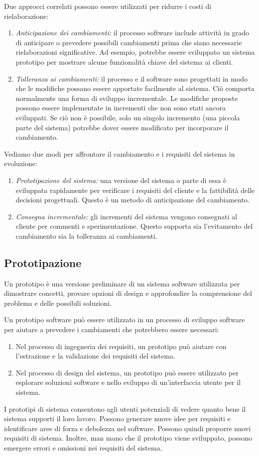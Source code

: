 Due approcci correlati possono essere utilizzati per ridurre i costi di rielaborazione:
\begin{enumerate}
    \item \textit{Anticipazione dei cambiamenti:} il processo software include attività in grado di anticipare o prevedere possibili cambiamenti prima che siano necessarie rielaborazioni significative. Ad esempio, potrebbe essere sviluppato un sistema prototipo per mostrare alcune funzionalità chiave del sistema ai clienti.
    \item \textit{Tolleranza ai cambiamenti:} il processo e il software sono progettati in modo che le modifiche possano essere apportate facilmente al sistema. Ciò comporta normalmente una forma di sviluppo incrementale. Le modifiche proposte possono essere implementate in incrementi che non sono stati ancora sviluppati. Se ciò non è possibile, solo un singolo incremento (una piccola parte del sistema) potrebbe dover essere modificato per incorporare il cambiamento.
\end{enumerate}
Vediamo due modi per affrontare il cambiamento e i requisiti del sistema in evoluzione:
\begin{enumerate}
    \item \textit{Prototipazione del sistema:} una versione del sistema o parte di essa è sviluppata rapidamente per verificare i requisiti del cliente e la fattibilità delle decisioni progettuali. Questo è un metodo di anticipazione del cambiamento.
    \item \textit{Consegna incrementale:} gli incrementi del sistema vengono consegnati al cliente per commenti e sperimentazione. Questo supporta sia l'evitamento del cambiamento sia la tolleranza ai cambiamenti.
\end{enumerate}

\subsection{Prototipazione}
Un prototipo è una versione preliminare di un sistema software utilizzata per dimostrare concetti, provare opzioni di design e approfondire la comprensione del problema e delle possibili soluzioni.

Un prototipo software può essere utilizzato in un processo di sviluppo software per aiutare a prevedere i cambiamenti che potrebbero essere necessari:
\begin{enumerate}
    \item Nel processo di ingegneria dei requisiti, un prototipo può aiutare con l'estrazione e la validazione dei requisiti del sistema.
    \item Nel processo di design del sistema, un prototipo può essere utilizzato per esplorare soluzioni software e nello sviluppo di un'interfaccia utente per il sistema.
\end{enumerate}
I prototipi di sistema consentono agli utenti potenziali di vedere quanto bene il sistema supporti il loro lavoro. Possono generare nuove idee per requisiti e identificare aree di forza e debolezza nel software. Possono quindi proporre nuovi requisiti di sistema. Inoltre, man mano che il prototipo viene sviluppato, possono emergere errori e omissioni nei requisiti del sistema.

